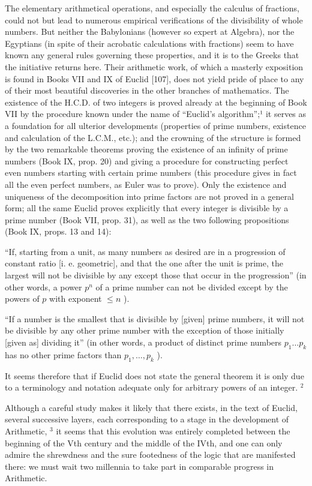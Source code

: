 The elementary arithmetical operations, and especially the calculus of fractions, could not but lead to numerous empirical verifications of the divisibility of whole numbers. But neither the Babylonians (however so expert at Algebra), nor the Egyptians (in spite of their acrobatic calculations with fractions) seem to have known any general rules governing these properties, and it is to the Greeks that the initiative returns here. Their arithmetic work, of which a masterly exposition is found in Books VII and IX of Euclid {[}107{]}, does not yield pride of place to any of their most beautiful discoveries in the other branches of mathematics. The existence of the H.C.D. of two integers is proved already at the beginning of Book VII by the procedure known under the name of ``Euclid's algorithm'';¹ it serves as a foundation for all ulterior developments (properties of prime numbers, existence and calculation of the L.C.M., etc.); and the crowning of the structure is formed by the two remarkable theorems proving the existence of an infinity of prime numbers (Book IX, prop. 20) and giving a procedure for constructing perfect even numbers starting with certain prime numbers (this procedure gives in fact all the even perfect numbers, as Euler was to prove). Only the existence and uniqueness of the decomposition into prime factors are not proved in a general form; all the same Euclid proves explicitly that every integer is divisible by a prime number (Book VII, prop. 31), as well as the two following propositions (Book IX, props. 13 and 14):

``If, starting from a unit, as many numbers as desired are in a progression of constant ratio {[}i. e. geometric{]}, and that the one after the unit is prime, the largest will not be divisible by any except those that occur in the progression'' (in other words, a power \(p^n\) of a prime number can not be divided except by the powers of \(p\) with exponent \(\leq n\) ).

``If a number is the smallest that is divisible by {[}given{]} prime numbers, it will not be divisible by any other prime number with the exception of those initially {[}given as{]} dividing it'' (in other words, a product of distinct prime numbers \(p_1 \ldots p_k\) has no other prime factors than \(p_1, \ldots, p_k\) ).

It seems therefore that if Euclid does not state the general theorem it is only due to a terminology and notation adequate only for arbitrary powers of an integer. \(^{2}\)

Although a careful study makes it likely that there exists, in the text of Euclid, several successive layers, each corresponding to a stage in the development of Arithmetic, \(^{3}\) it seems that this evolution was entirely completed between the beginning of the Vth century and the middle of the IVth, and one can only admire the shrewdness and the sure footedness of the logic that are manifested there: we must wait two millennia to take part in comparable progress in Arithmetic.

